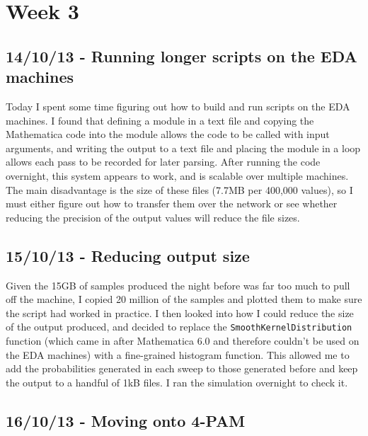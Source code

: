 \section{Week 3}

\subsection{14/10/13 - Running longer scripts on the EDA machines}

Today I spent some time figuring out how to build and run scripts on the
EDA machines. I found that defining a module in a text file and copying
the Mathematica code into the module allows the code to be called with
input arguments, and writing the output to a text file and placing the
module in a loop allows each pass to be recorded for later
parsing. After running the code overnight, this
system appears to work, and is scalable over multiple machines. The
main disadvantage is the size of these files (7.7MB per 400,000 values),
so I must either figure out how to transfer them over the network or see
whether reducing the precision of the output values will reduce the file
sizes.

\subsection{15/10/13 - Reducing output size}

Given the 15GB of samples produced the night before was far too much to
pull off the machine, I copied 20 million of the samples and plotted
them to make sure the script had worked in practice. I then looked into how
I could reduce the size of the output produced, and decided to replace
the \texttt{SmoothKernelDistribution} function (which came in after
Mathematica 6.0 and therefore couldn't be used on the EDA machines) with
a fine-grained histogram function. This
allowed me to add the probabilities generated in each sweep to those
generated before and keep the output to a handful of 1kB files. I ran
the simulation overnight to check it.

\subsection{16/10/13 - Moving onto 4-PAM}

